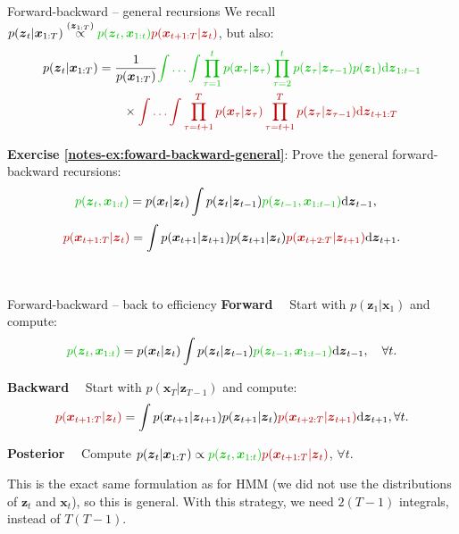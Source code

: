 \documentclass{beamer}
\newcommand{\bs}[1]{\boldsymbol{#1}}
\newcommand{\exercise}[2]{\noindent\colorbox{blue!10}{\parbox{0.995\textwidth}{\textbf{Exercise \ref{notes-ex:#1}}: #2}}\\}
\begin{document}
\begin{frame}{Forward-backward -- general recursions}
We recall $p(\bs{z}_t|\bs{x}_{1:T}) \stackrel{(\bs{z}_{1:T})}{\propto} {\color{mygreen}p(\bs{z}_t,\bs{x}_{1:t})} {\color{myred}p(\bs{x}_{t+1:T}|\bs{z}_t)}$, but also:
{\small\begin{align*}
 p(\bs{z}_{t}|\bs{x}_{1:T}) &= \frac{1}{p(\bs{x}_{1:T})}{\color{mygreen}\int\ldots\int \prod_{\tau=1}^{t} p(\bs{x}_{\tau}|\bs{z}_{\tau}) \prod_{\tau=2}^{t} p(\bs{z}_{\tau}|\bs{z}_{\tau-1})p(\bs{z}_1) \textrm{d}\bs{z}_{1:t-1}}  \\
 & \qquad \times {\color{myred}\int\ldots\int \prod_{\tau=t+1}^{T} p(\bs{x}_{\tau}|\bs{z}_{\tau}) \prod_{\tau=t+1}^{T} p(\bs{z}_{\tau}|\bs{z}_{\tau-1}) \textrm{d}\bs{z}_{t+1:T}}
\end{align*}}
\pause

\exercise{foward-backward-general}{Prove the general forward-backward recursions:
 \begin{align*}
   {\color{mygreen}p(\bs{z}_t,\bs{x}_{1:t})} &= p(\bs{x}_t|\bs{z}_t) \int p(\bs{z}_t|\bs{z}_{t-1}) {\color{mygreen}p(\bs{z}_{t-1},\bs{x}_{1:t-1})} \textrm{d}\bs{z}_{t-1},
 \end{align*}
  \begin{equation*}
  {\color{myred}p(\bs{x}_{t+1:T}|\bs{z}_t)} = \int p(\bs{x}_{t+1}|\bs{z}_{t+1}) p(\bs{z}_{t+1}|\bs{z}_{t}) {\color{myred}p(\bs{x}_{t+2:T}|\bs{z}_{t+1})} \textrm{d}\bs{z}_{t+1}.
 \end{equation*}
}
\end{frame}




\begin{frame}{Forward-backward -- back to efficiency}
 \textbf{Forward}$\quad$ Start with $p(\bs{z}_1|\bs{x}_1)$ and compute: {\small
 \[ {\color{mygreen}p(\bs{z}_t,\bs{x}_{1:t})} = p(\bs{x}_t|\bs{z}_t) \int p(\bs{z}_t|\bs{z}_{t-1}) {\color{mygreen}p(\bs{z}_{t-1},\bs{x}_{1:t-1})} \textrm{d}\bs{z}_{t-1}, \quad\forall t. \]}
 
 \textbf{Backward}$\quad$ Start with $p(\bs{x}_T|\bs{z}_{T-1})$ and compute:
 {\small
  \begin{equation*}
  {\color{myred}p(\bs{x}_{t+1:T}|\bs{z}_t)} = \int p(\bs{x}_{t+1}|\bs{z}_{t+1}) p(\bs{z}_{t+1}|\bs{z}_{t}) {\color{myred}p(\bs{x}_{t+2:T}|\bs{z}_{t+1})} \textrm{d}\bs{z}_{t+1}, \forall t.
 \end{equation*}
 }
 
 \textbf{Posterior}$\quad$ Compute $p(\bs{z}_t|\bs{x}_{1:T})\propto {\color{mygreen}p(\bs{z}_t,\bs{x}_{1:t})}{\color{myred}p(\bs{x}_{t+1:T}|\bs{z}_t)}$, $\forall t$.\vspace{6mm}
 
 This is the exact same formulation as for HMM (we did not use the distributions of $\bs{z}_t$ and $\bs{x}_t$), so this is general. With this strategy, we need $2(T-1)$ integrals, instead of $T(T-1)$.
\end{frame}
\end{document}
